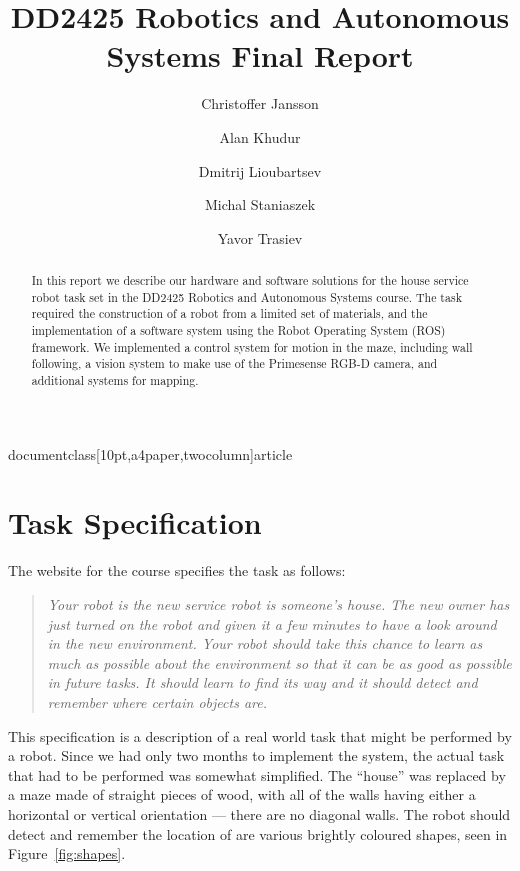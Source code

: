 documentclass[10pt,a4paper,twocolumn]{article}

\usepackage[top=1cm,bottom=2cm,left=2cm,right=2cm]{geometry}
\usepackage{graphicx}
\usepackage[backend=bibtex]{biblatex}
\usepackage{hyperref}
\usepackage{amsmath}
\usepackage{xcolor}
\usepackage{listings}

\author{Christoffer Jansson \and Alan Khudur \and Dmitrij Lioubartsev \and Michal Staniaszek \and Yavor Trasiev}
\title{DD2425 Robotics and Autonomous Systems Final Report}


\maketitle
\begin{abstract}
  In this report we describe our hardware and software solutions for the house
  service robot task set in the DD2425 Robotics and Autonomous Systems course.
  The task required the construction of a robot from a limited set of materials,
  and the implementation of a software system using the Robot Operating System
  (ROS)\cite{rosorg} framework. We implemented a control system for motion in
  the maze, including wall following, a vision system to make use of the
  Primesense RGB-D camera, and additional systems for mapping.
\end{abstract}
\section{Task Specification}
The website for the course specifies the task as follows:
\begin{quote}
  \emph{Your robot is the new service robot is someone's house. The new owner has just
  turned on the robot and given it a few minutes to have a look around in the
  new environment. Your robot should take this chance to learn as much as
  possible about the environment so that it can be as good as possible in future
  tasks. It should learn to find its way and it should detect and remember where
  certain objects are.}
\end{quote}
This specification is a description of a real world task that might be performed
by a robot. Since we had only two months to implement the system, the actual
task that had to be performed was somewhat simplified. The ``house'' was
replaced by a maze made of straight pieces of wood, with all of the walls having
either a horizontal or vertical orientation --- there are no diagonal walls. The
robot should detect and remember the location of are various brightly coloured
shapes, seen in Figure~\ref{fig:shapes}.

